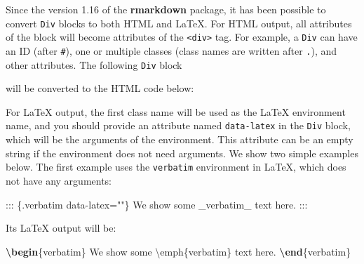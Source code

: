 \documentclass[
  11pt,
]{krantz}
\newenvironment{Shaded}{\begin{snugshade}}{\end{snugshade}}
\newcommand{\ExtensionTok}[1]{#1}
\newcommand{\KeywordTok}[1]{\textcolor[rgb]{0.27,0.27,0.27}{\textbf{#1}}}
\newcommand{\NormalTok}[1]{#1}
\newcommand{\OtherTok}[1]{\textcolor[rgb]{0.37,0.37,0.37}{#1}}
\newcommand{\StringTok}[1]{\textcolor[rgb]{0.5,0.5,0.5}{#1}}
\newcommand{\VerbatimStringTok}[1]{\textcolor[rgb]{0.5,0.5,0.5}{#1}}
\begin{document}
Since the version 1.16 of the \textbf{rmarkdown} package, it has been possible to convert \texttt{Div} blocks to both HTML and LaTeX. For HTML output, all attributes of the block will become attributes of the \texttt{\textless{}div\textgreater{}} tag. For example, a \texttt{Div} can have an ID (after \texttt{\#}), one or multiple classes (class names are written after \texttt{.}), and other attributes. The following \texttt{Div} block

\begin{Shaded}
\end{Shaded}

will be converted to the HTML code below:

\begin{Shaded}
\end{Shaded}

For LaTeX output, the first class name will be used as the LaTeX environment name, and you should provide an attribute named \texttt{data-latex} in the \texttt{Div} block, which will be the arguments of the environment. This attribute can be an empty string if the environment does not need arguments. We show two simple examples below. The first example uses the \texttt{verbatim} environment in LaTeX, which does not have any arguments:

\begin{Shaded}
\begin{Highlighting}[]
\NormalTok{::: \{.verbatim data-latex=""\}}
\NormalTok{We show some _verbatim_ text here.}
\NormalTok{:::}
\end{Highlighting}
\end{Shaded}

Its LaTeX output will be:

\begin{Shaded}
\begin{Highlighting}[]
\KeywordTok{\textbackslash{}begin}\NormalTok{\{}\ExtensionTok{verbatim}\NormalTok{\}}
\VerbatimStringTok{We show some \textbackslash{}emph\{verbatim\} text here.}
\KeywordTok{\textbackslash{}end}\NormalTok{\{}\ExtensionTok{verbatim}\NormalTok{\}}
\end{Highlighting}
\end{Shaded}
\end{document}
